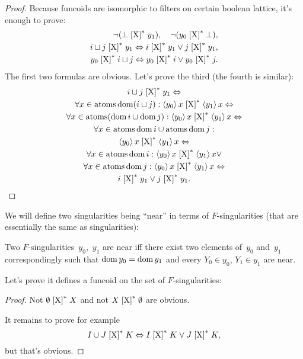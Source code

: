 \begin{proof}
Because funcoids are isomorphic to filters on certain boolean lattice, it's enough to prove:
\begin{align*}
\lnot(\bot\mathrel{\left[\mathrm{X}\right]^{\ast}}y_1),\quad
\lnot(y_0\mathrel{\left[\mathrm{X}\right]^{\ast}}\bot),\\
i\sqcup j\mathrel{\left[\mathrm{X}\right]^{\ast}}y_1 \Leftrightarrow
i\mathrel{\left[\mathrm{X}\right]^{\ast}}y_1\lor j\mathrel{\left[\mathrm{X}\right]^{\ast}}y_1,\\
y_0\mathrel{\left[\mathrm{X}\right]^{\ast}}i\sqcup j \Leftrightarrow
y_0\mathrel{\left[\mathrm{X}\right]^{\ast}}i\lor y_0\mathrel{\left[\mathrm{X}\right]^{\ast}}j.
\end{align*}
The first two formulas are obvious. Let's prove the third (the fourth is similar):
\begin{multline*}
i\sqcup j\mathrel{\left[\mathrm{X}\right]^{\ast}}y_1 \Leftrightarrow\\
\forall x\in\operatorname{atoms}\operatorname{dom}(i\sqcup j):
\left\langle y_0\right\rangle x \mathrel{\left[\mathrm{X}\right]^{\ast}} \left\langle y_1\right\rangle x \Leftrightarrow\\
\forall x\in\operatorname{atoms}(\operatorname{dom} i\sqcup\operatorname{dom} j):
\left\langle y_0\right\rangle x \mathrel{\left[\mathrm{X}\right]^{\ast}} \left\langle y_1\right\rangle x \Leftrightarrow\\
\forall x\in\operatorname{atoms}\operatorname{dom} i\cup\operatorname{atoms}\operatorname{dom} j:\\
\left\langle y_0\right\rangle x \mathrel{\left[\mathrm{X}\right]^{\ast}} \left\langle y_1\right\rangle x \Leftrightarrow\\
\forall x\in\operatorname{atoms}\operatorname{dom} i:
\left\langle y_0\right\rangle x \mathrel{\left[\mathrm{X}\right]^{\ast}} \left\langle y_1\right\rangle x \lor\\
\forall x\in\operatorname{atoms}\operatorname{dom} j:
\left\langle y_0\right\rangle x \mathrel{\left[\mathrm{X}\right]^{\ast}} \left\langle y_1\right\rangle x \Leftrightarrow\\
i\mathrel{\left[\mathrm{X}\right]^{\ast}}y_1\lor j\mathrel{\left[\mathrm{X}\right]^{\ast}}y_1.
\end{multline*}
\end{proof}

We will define two singularities being ``near'' 
in terms of $F$-singularities (that are essentially the same as singularities):

Two $F$-singularities~$y_0$,~$y_1$ are near iff
there exist two elements of~$y_0$ and~$y_1$ correspondingly such that $\operatorname{dom} y_0=\operatorname{dom} y_1$ and every $Y_0\in y_0$, $Y_1\in y_1$ are near.

Let's prove it defines a funcoid on the set of $F$-singularities:

\begin{proof}
Not $\emptyset\mathrel{\left[\mathrm{X}\right]^{\ast}}X$ and not $X\mathrel{\left[\mathrm{X}\right]^{\ast}}\emptyset$ are obvious.

It remains to prove for example
\[ I\cup J\mathrel{\left[\mathrm{X}\right]^{\ast}}K \Leftrightarrow 
I\mathrel{\left[\mathrm{X}\right]^{\ast}}K \lor J\mathrel{\left[\mathrm{X}\right]^{\ast}}K, \]
but that's obvious.
\end{proof}

